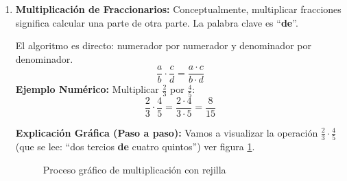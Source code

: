 \begin{enumerate}
\begin{enumerate}
        \textbf{Utilizando el MCM:} Sumar $\frac{7}{90}$ con $\frac{13}{120}$. 
        $\mathcal{MCM}(90,120)=360$.
        \begin{equation*}
            \frac{7}{90}+\frac{13}{120}=\frac{7\cdot 4+13\cdot 3}{360}=\frac{28+39}{360}=\frac{67}{360}
        \end{equation*}
    \end{enumerate}
\item \textbf{Multiplicación de Fraccionarios:} 
    Conceptualmente, multiplicar fracciones significa calcular una parte de otra parte. La palabra clave es ``\textbf{de}''.
    
    El algoritmo es directo: numerador por numerador y denominador por denominador.
    \begin{equation}
    \boxed{\frac{a}{b} \cdot \frac{c}{d} = \frac{a \cdot c}{b \cdot d}}
    \end{equation}
    \textbf{Ejemplo Numérico:} Multiplicar $\frac{2}{3}$ por $\frac{4}{5}$:
    \[ \frac{2}{3} \cdot \frac{4}{5} = \frac{2 \cdot 4}{3 \cdot 5} = \frac{8}{15} \]

    \textbf{Explicación Gráfica (Paso a paso):} 
    Vamos a visualizar la operación $\frac{2}{3} \cdot \frac{4}{5}$ (que se lee: ``dos tercios \textbf{de} cuatro quintos'') ver figura \ref{fig:multpasos}.
    
       \begin{figure}[ht]
    \centering
    \caption{Proceso gráfico de multiplicación con rejilla}\label{fig:multpasos}
\end{figure}
\end{enumerate}
